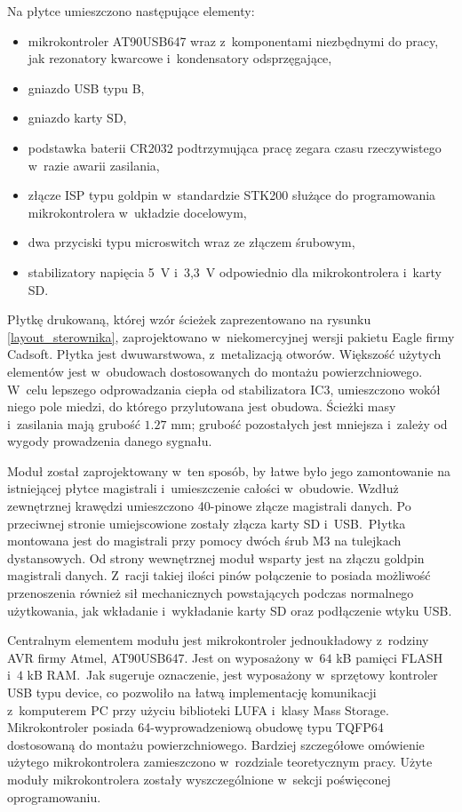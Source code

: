 Na płytce umieszczono następujące elementy:
\begin{itemize}
	\item mikrokontroler AT90USB647 wraz z~komponentami niezbędnymi do pracy, jak rezonatory kwarcowe i~kondensatory odsprzęgające,
	\item gniazdo USB typu B,
	\item gniazdo karty SD,
	\item podstawka baterii CR2032 podtrzymująca pracę zegara czasu rzeczywistego w~razie awarii zasilania,
	\item złącze ISP typu goldpin w~standardzie STK200 służące do programowania mikrokontrolera w~układzie docelowym,
	\item dwa przyciski typu microswitch wraz ze złączem śrubowym,
	\item stabilizatory napięcia 5~V i~3,3~V odpowiednio dla mikrokontrolera i~karty SD.
\end{itemize}

Płytkę drukowaną, której wzór ścieżek zaprezentowano na rysunku \ref{layout_sterownika}, zaprojektowano w~niekomercyjnej wersji pakietu Eagle firmy Cadsoft. Płytka jest dwuwarstwowa, z~metalizacją otworów. Większość użytych elementów jest w~obudowach dostosowanych do montażu powierzchniowego. W~celu lepszego odprowadzania ciepła od stabilizatora IC3, umieszczono wokół niego pole miedzi, do którego przylutowana jest obudowa. Ścieżki masy i~zasilania mają grubość $1.27$ mm; grubość pozostałych jest mniejsza i~zależy od wygody prowadzenia danego sygnału.

Moduł został zaprojektowany w~ten sposób, by łatwe było jego zamontowanie na istniejącej płytce magistrali i~umieszczenie całości w~obudowie. Wzdłuż zewnętrznej krawędzi umieszczono 40-pinowe złącze magistrali danych. Po przeciwnej stronie umiejscowione zostały złącza karty SD i~USB.~Płytka montowana jest do magistrali przy pomocy dwóch śrub M3 na tulejkach dystansowych. Od strony wewnętrznej moduł wsparty jest na złączu goldpin magistrali danych. Z~racji takiej ilości pinów połączenie to posiada możliwość przenoszenia również sił mechanicznych powstających podczas normalnego użytkowania, jak wkładanie i~wykładanie karty SD oraz podłączenie wtyku USB.

Centralnym elementem modułu jest mikrokontroler jednoukładowy z~rodziny AVR firmy Atmel, AT90USB647. Jest on wyposażony w~$64$ kB pamięci FLASH i~$4$ kB RAM.~Jak sugeruje oznaczenie, jest wyposażony w~sprzętowy kontroler USB typu device, co pozwoliło na łatwą implementację komunikacji z~komputerem PC przy użyciu biblioteki LUFA i~klasy Mass Storage. Mikrokontroler posiada 64-wyprowadzeniową obudowę typu TQFP64 dostosowaną do montażu powierzchniowego. Bardziej szczegółowe omówienie użytego mikrokontrolera zamieszczono w~rozdziale teoretycznym pracy. Użyte moduły mikrokontrolera zostały wyszczególnione w~sekcji poświęconej oprogramowaniu.

